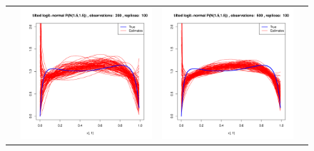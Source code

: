 \begin{figure}[h]
\begin{tabular}{cccc}
	&
	\includegraphics[width=\textwidth/4]{../img/logitnormal/tilted/K2/densities/n200_R100.pdf}
	&
	\includegraphics[width=\textwidth/4]{../img/logitnormal/tilted/K2/densities/n500_R100.pdf}\\
	

\end{tabular}
\end{figure}
